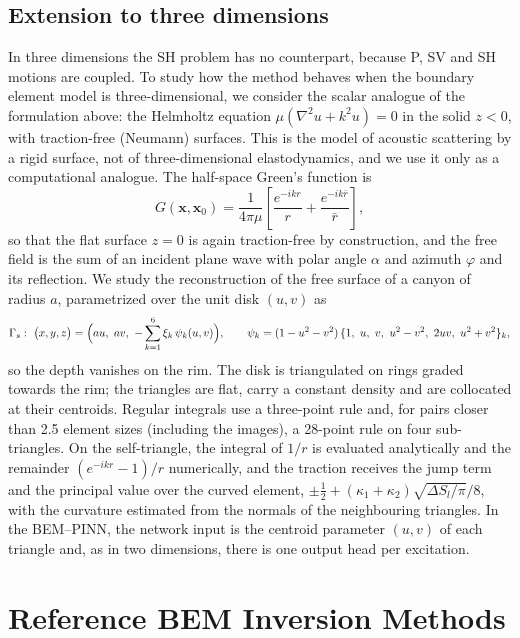 \documentclass[11pt,twoside]{article}
\begin{document}
\subsection{Extension to three dimensions}\label{sec:method3d}

In three dimensions the SH problem has no counterpart, because P, SV and SH motions are coupled. To study how the method behaves when the boundary element model is three-dimensional, we consider the scalar analogue of the formulation above: the Helmholtz equation $\mu(\nabla^2 u + k^2 u)=0$ in the solid $z<0$, with traction-free (Neumann) surfaces. This is the model of acoustic scattering by a rigid surface, not of three-dimensional elastodynamics, and we use it only as a computational analogue. The half-space Green's function is
\begin{equation*}
  G(\mathbf{x},\mathbf{x}_0) = \frac{1}{4\pi\mu}\left[\frac{e^{-ikr}}{r} + \frac{e^{-ik\bar r}}{\bar r}\right],
\end{equation*}
so that the flat surface $z=0$ is again traction-free by construction, and the free field is the sum of an incident plane wave with polar angle $\alpha$ and azimuth $\varphi$ and its reflection. We study the reconstruction of the free surface of a canyon of radius $a$, parametrized over the unit disk $(u,v)$ as
\begin{equation}\label{eq:canyon3d}
  \Gamma_s:\ \bigl(x,y,z\bigr) = \Bigl(au,\ av,\ -\sum_{k=1}^{6}\xi_k\,\psi_k(u,v)\Bigr),\qquad
  \psi_k = (1-u^2-v^2)\,\{1,\ u,\ v,\ u^2-v^2,\ 2uv,\ u^2+v^2\}_k ,
\end{equation}
so the depth vanishes on the rim. The disk is triangulated on rings graded towards the rim; the triangles are flat, carry a constant density and are collocated at their centroids. Regular integrals use a three-point rule and, for pairs closer than 2.5 element sizes (including the images), a 28-point rule on four sub-triangles. On the self-triangle, the integral of $1/r$ is evaluated analytically and the remainder $(e^{-ikr}-1)/r$ numerically, and the traction receives the jump term and the principal value over the curved element, $\pm\frac12 + (\kappa_1+\kappa_2)\sqrt{\Delta S_l/\pi}/8$, with the curvature estimated from the normals of the neighbouring triangles. In the BEM--PINN, the network input is the centroid parameter $(u,v)$ of each triangle and, as in two dimensions, there is one output head per excitation.

\section{Reference BEM Inversion Methods}\label{sec:baselines}
\end{document}
